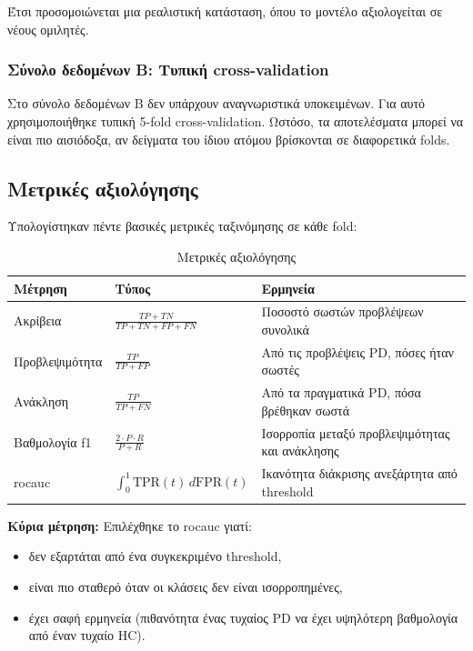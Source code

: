 Έτσι προσομοιώνεται μια ρεαλιστική κατάσταση, όπου το μοντέλο αξιολογείται σε νέους ομιλητές.

\subsubsection{Σύνολο δεδομένων B: Τυπική cross-validation}

Στο σύνολο δεδομένων B δεν υπάρχουν αναγνωριστικά υποκειμένων. Για αυτό χρησιμοποιήθηκε τυπική 5-fold cross-validation. Ωστόσο, τα αποτελέσματα μπορεί να είναι πιο αισιόδοξα, αν δείγματα του ίδιου ατόμου βρίσκονται σε διαφορετικά folds.

\subsection{Μετρικές αξιολόγησης}
\label{sec:eval-metrics}

Υπολογίστηκαν πέντε βασικές μετρικές ταξινόμησης σε κάθε fold:

\begin{table}[H]
\centering
\begin{tabular}{@{}lp{4cm}p{6cm}@{}}
\toprule
\textbf{Μέτρηση} & \textbf{Τύπος} & \textbf{Ερμηνεία} \\
\midrule
Ακρίβεια & $\frac{TP+TN}{TP+TN+FP+FN}$ & Ποσοστό σωστών προβλέψεων συνολικά \\
Προβλεψιμότητα & $\frac{TP}{TP+FP}$ & Από τις προβλέψεις PD, πόσες ήταν σωστές \\
Ανάκληση & $\frac{TP}{TP+FN}$ & Από τα πραγματικά PD, πόσα βρέθηκαν σωστά \\
Βαθμολογία f1 & $\frac{2 \cdot P \cdot R}{P+R}$ & Ισορροπία μεταξύ προβλεψιμότητας και ανάκλησης \\
\gls{rocauc} & $\int_0^1 \text{TPR}(t) \, d\text{FPR}(t)$ & Ικανότητα διάκρισης ανεξάρτητα από threshold \\
\bottomrule
\end{tabular}
\caption{Μετρικές αξιολόγησης}
\label{tab:metrics}
\end{table}

\textbf{Κύρια μέτρηση:} Επιλέχθηκε το \gls{rocauc} γιατί:
\begin{itemize}
    \item δεν εξαρτάται από ένα συγκεκριμένο threshold,
    \item είναι πιο σταθερό όταν οι κλάσεις δεν είναι ισορροπημένες,
    \item έχει σαφή ερμηνεία (πιθανότητα ένας τυχαίος PD να έχει υψηλότερη βαθμολογία από έναν τυχαίο HC).
\end{itemize}

